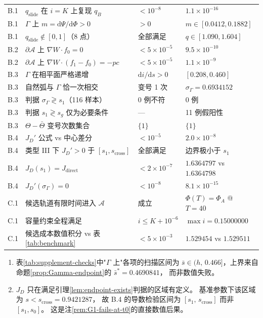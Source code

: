 \begin{table}[htbp]
\begin{tabular}{@{}llll@{}}
B.1 & $q_{\mathrm{slide}}$ 在 $i=K$ 上复现 $q_B$ & $<10^{-8}$ & $1.1\times10^{-16}$\\
B.1 & $\Gamma$ 上 $m=\mathrm{d}\Psi/\mathrm{d}\Phi>0$ & $>0$ & $m\in[0.0412,0.1882]$\\
B.1 & $q_{\mathrm{slide}}\notin[0,1]$（8 点） & 全部满足 & $q\in[1.090,1.604]$\\
B.2 & $\partial\mathcal{A}$ 上 $\nabla W\cdot f_0=0$ & $<5\times10^{-5}$ & $9.5\times10^{-10}$\\
B.2 & $\partial\mathcal{A}$ 上 $\nabla W\cdot(f_1-f_0)=-pc$ & $<5\times10^{-5}$ & $1.1\times10^{-9}$\\
B.3 & $\Gamma$ 在相平面严格递增 & $\mathrm{d}i/\mathrm{d}s>0$ & $[0.208,0.460]$\\
B.3 & 自然弧与 $\Gamma$ 恰一次相交 & 变号 1 次 & $\sigma_\Gamma=0.6934152$\\
B.3 & 判据 $\sigma_\Gamma\gtrless s_1$（116 样本） & 0 例不符 & 0 例\\
B.3 & 判据 $s_1\gtrless s_g$ 仅为必要条件 & --- & 11 例假阳性\\
B.3 & $\Theta-\bar\Theta$ 变号次数集合 & $\{1\}$ & $\{1\}$\\
B.4 & $J_D'$ 公式 vs 中心差分 & $<10^{-5}$ & $2.0\times10^{-8}$\\
B.4 & 类型 III 下 $J_D'>0$ 于 $[s_1,s_{\mathrm{cross}}]$ & 全部满足 & 边界极小于 $s_1$\\
B.4 & $J_D(s_1)=J_{\mathrm{direct}}$ & $<2\times10^{-7}$ & $1.6364797$ vs $1.6364798$\\
B.4 & $J_D'(\sigma_\Gamma)=0$ & $<10^{-8}$ & $8.1\times10^{-15}$\\
C.1 & 候选轨道有限时间进入 $\mathcal{A}$ & 成立 & $\Phi(T)=\Phi_A$ @ $T=40$\\
C.1 & 容量约束全程满足 & $i\le K+10^{-6}$ & $\max i=0.15000000$\\
C.1 & 候选成本数值积分 vs 表\ref{tab:benchmark} & $<5\times10^{-3}$ & $1.529454$ vs $1.529511$\\
\bottomrule
\end{tabular}
\end{table}

\begin{remark}
\label{rem:D-caliber}
\begin{enumerate}
\item[(i)] 表\ref{tab:supplement-checks}中"$\Gamma$ 上"各项的扫描区间为
      $\bar s\in(h,\,0.466]$，上界来自命题\ref{prop:Gamma-endpoint}的 $\bar s^*=0.4690841$，
      而非数值失败。
\item[(ii)] $J_D$ 只在满足引理\ref{lem:endpoint-exists}判据的区域有定义。
      基准参数下该区域为 $s<s_{\mathrm{cross}}=0.9421287$，
      故 B.4 的导数检验区间为 $[s_1,\,s_{\mathrm{cross}}]$ 而非 $[s_1,s_0]$。
      这是注\ref{rem:G1-fails-at-t0}的直接数值后果。
\end{enumerate}
\end{remark}

